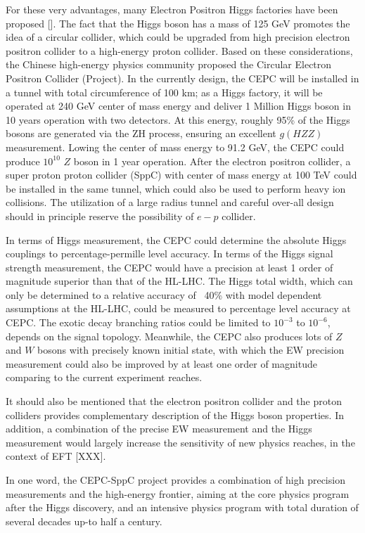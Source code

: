 For these very advantages, many Electron Positron Higgs factories have been proposed [].
The fact that the Higgs boson has a mass of 125 GeV promotes the idea of a circular collider,
which could be upgraded from high precision electron positron collider to a high-energy proton collider.
Based on these considerations, the Chinese high-energy physics community proposed the Circular Electron Positron Collider (Project).
In the currently design, the CEPC will be installed in a tunnel with total circumference of 100 km;
as a Higgs factory, it will be operated at 240 GeV center of mass energy
and deliver 1 Million Higgs boson in 10 years operation with two detectors.
At this energy, roughly 95\% of the Higgs bosons are generated via the ZH process,
ensuring an excellent $g(HZZ)$ measurement.
Lowing the center of mass energy to 91.2 GeV, the CEPC could produce $10^{10}$ $Z$ boson in 1 year operation.
After the electron positron collider,
a super proton proton collider (SppC) with center of mass energy at 100 TeV could be installed in the same tunnel,
which could also be used to perform heavy ion collisions.
The utilization of a large radius tunnel and careful over-all design should in principle reserve the possibility of $e-p$ collider. 

In terms of Higgs measurement, the CEPC could determine the absolute Higgs couplings to percentage-permille level accuracy.
In terms of the Higgs signal strength measurement, the CEPC would have a precision at least 1 order of magnitude superior
than that of the HL-LHC.
The Higgs total width, which can only be determined to a relative accuracy of ~40\% with model dependent assumptions at the HL-LHC,
could be measured to percentage level accuracy at CEPC.
The exotic decay branching ratios could be limited to $10^{-3}$ to $10^{-6}$,
depends on the signal topology.
Meanwhile, the CEPC also produces lots of $Z$ and $W$ bosons with precisely known initial state,
with which the EW precision measurement could also be improved by at least one order of magnitude comparing
to the current experiment reaches. 

It should also be mentioned that the electron positron collider
and the proton colliders provides complementary description of the Higgs boson properties.
In addition, a combination of the precise EW measurement
and the Higgs measurement would largely increase the sensitivity of new physics reaches, in the context of EFT [XXX].  

In one word, the CEPC-SppC project provides a combination of high precision measurements and the high-energy frontier,
aiming at the core physics program after the Higgs discovery,
and an intensive physics program with total duration of several decades up-to half a century.


